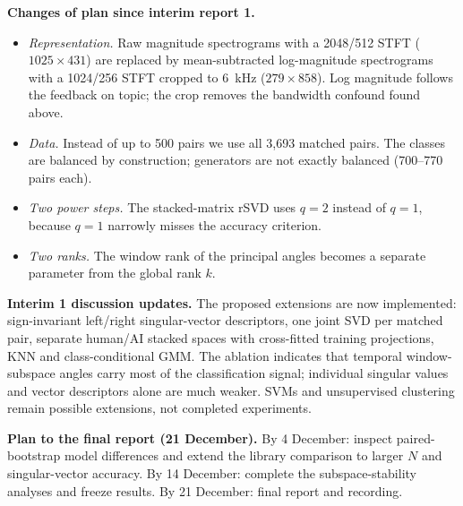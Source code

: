 \documentclass[11pt,a4paper]{article}
\theoremstyle{plain}
\theoremstyle{definition}
\theoremstyle{remark}
\begin{document}
\textbf{Changes of plan since interim report 1.}
\begin{itemize}\itemsep0pt
\item \emph{Representation.} Raw magnitude spectrograms with a 2048/512 STFT
  ($1025\times431$) are replaced by mean-subtracted log-magnitude
  spectrograms with a 1024/256 STFT cropped to 6~kHz ($279\times858$). Log
  magnitude follows the feedback on topic; the crop removes the bandwidth
  confound found above.
\item \emph{Data.} Instead of up to 500 pairs we use all 3{,}693 matched
  pairs. The classes are balanced by construction; generators are not
  exactly balanced (700--770 pairs each).
\item \emph{Two power steps.} The stacked-matrix rSVD uses $q=2$ instead of
  $q=1$, because $q=1$ narrowly misses the accuracy criterion.
\item \emph{Two ranks.} The window rank of the principal angles becomes a
  separate parameter from the global rank $k$.
\end{itemize}

\textbf{Interim 1 discussion updates.} The proposed extensions are now
implemented: sign-invariant left/right singular-vector descriptors, one joint
SVD per matched pair, separate human/AI stacked spaces with cross-fitted
training projections, KNN and class-conditional GMM. The ablation indicates
that temporal window-subspace angles carry most of the classification signal;
individual singular values and vector descriptors alone are much weaker.
SVMs and unsupervised clustering remain possible extensions, not completed
experiments.

\textbf{Plan to the final report (21 December).} By 4 December: inspect
paired-bootstrap model differences and extend the library comparison to
larger $N$ and singular-vector accuracy. By 14 December: complete the
subspace-stability analyses and freeze results. By 21 December: final
report and recording.
\end{document}
